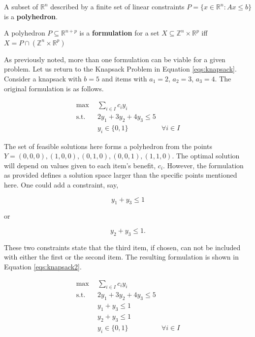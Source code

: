 \begin{define}\label{def:polyhedron}
A subset of $\mathbb{R}^n$ described by a finite set of linear constraints $P
= \{ x \in \mathbb{R}^n : Ax \leq b\}$ is a \textbf{polyhedron}.
\end{define}

\begin{define}\label{def:formulation}
A polyhedron $P \subseteq \mathbb{R}^{n+p}$ is a \textbf{formulation} for a set
$X \subseteq \mathbb{Z}^n \times \mathbb{R}^p$ iff $X = P \cap \left( 
\mathbb{Z}^n \times \mathbb{R}^p \right)$
\end{define}

As previously noted, more than one formulation can be viable for a given
problem. Let us return to the Knapsack Problem in
Equation \ref{eqs:knapsack}. Consider a knapsack with $b = 5$ and items with
$a_1 = 2$, $a_2 = 3$, $a_3 = 4$. The original formulation is as follows.

\begin{subequations}\label{eqs:knapsack1}
  \begin{align}
    \max \:\: & 
    \sum_{i \in I} c_i y_i
    & \\
    \text{s.t.} \:\: &
    2y_1 + 3y_2 + 4y_3 \leq 5 
    & \\
    &
    y_i \in \{ 0, 1 \}
    &
    \forall i \in I
  \end{align}
\end{subequations}

The set of feasible solutions here forms a polyhedron from the points $Y = {(0,
0, 0), (1, 0, 0), (0, 1, 0), (0, 0, 1), (1, 1, 0)}$. The optimal solution will
depend on values given to each item's benefit, $c_i$. However, the formulation
as provided defines a solution space larger than the specific points mentioned
here. One could add a constraint, say, 

\begin{equation}
y_1 + y_3 \leq 1
\end{equation}

or 

\begin{equation}
y_2 + y_3 \leq 1.
\end{equation}

These two constraints state that the third item, if chosen, can not be included
with either the first or the second item. The resulting formulation is shown in
Equation \ref{eqs:knapsack2}.

\begin{subequations}\label{eqs:knapsack2}
  \begin{align}
    \max \:\: & 
    \sum_{i \in I} c_i y_i
    & \\
    \text{s.t.} \:\: &
    2y_1 + 3y_2 + 4y_3 \leq 5 
    & \\
    &
    y_1 + y_3 \leq 1        
    & \\
    &
    y_2 + y_3 \leq 1        
    & \\
    &
    y_i \in \{ 0, 1 \}
    &
    \forall i \in I
  \end{align}
\end{subequations}


